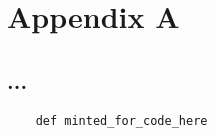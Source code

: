 \section{Appendix A}
\subsection{...}

\begin{verbatim}
    def minted_for_code_here

\end{verbatim}

\newpage